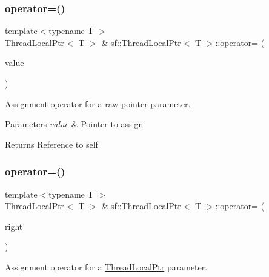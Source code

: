 \subsubsection{\texorpdfstring{operator=()}{operator=()}\hspace{0.1cm}{\footnotesize\ttfamily [1/2]}}
{\footnotesize\ttfamily template$<$typename T $>$ \\
\hyperlink{classsf_1_1_thread_local_ptr}{Thread\+Local\+Ptr}$<$ T $>$ \& \hyperlink{classsf_1_1_thread_local_ptr}{sf\+::\+Thread\+Local\+Ptr}$<$ T $>$\+::operator= (\begin{DoxyParamCaption}\item[{T $\ast$}]{value }\end{DoxyParamCaption})}



Assignment operator for a raw pointer parameter. 


\begin{DoxyParams}{Parameters}
{\em value} & Pointer to assign\\
\hline
\end{DoxyParams}
\begin{DoxyReturn}{Returns}
Reference to self 
\end{DoxyReturn}
\mbox{\label{classsf_1_1_thread_local_ptr_a6792a6a808af06f0d13e3ceecf2fc947}} 
\subsubsection{\texorpdfstring{operator=()}{operator=()}\hspace{0.1cm}{\footnotesize\ttfamily [2/2]}}
{\footnotesize\ttfamily template$<$typename T $>$ \\
\hyperlink{classsf_1_1_thread_local_ptr}{Thread\+Local\+Ptr}$<$ T $>$ \& \hyperlink{classsf_1_1_thread_local_ptr}{sf\+::\+Thread\+Local\+Ptr}$<$ T $>$\+::operator= (\begin{DoxyParamCaption}\item[{const \hyperlink{classsf_1_1_thread_local_ptr}{Thread\+Local\+Ptr}$<$ T $>$ \&}]{right }\end{DoxyParamCaption})}



Assignment operator for a \hyperlink{classsf_1_1_thread_local_ptr}{Thread\+Local\+Ptr} parameter. 


